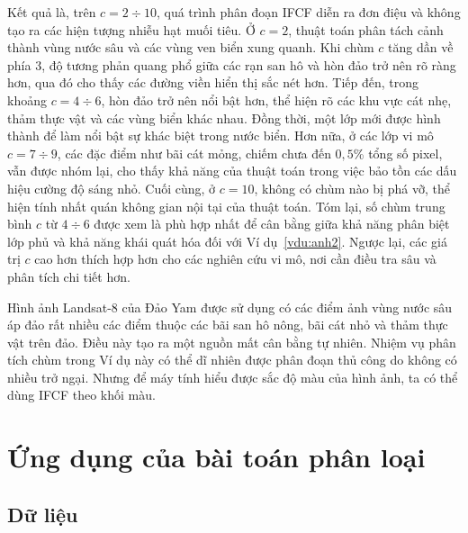 \documentclass[a4paper,oneside]{book} %
\theoremstyle{plain}
\theoremstyle{plain}
\theoremstyle{nonumberplain}
\begin{document}
Kết quả là, trên $c = 2\div10$, quá trình phân đoạn IFCF diễn ra đơn điệu và không tạo ra các hiện tượng nhiễu hạt muối tiêu. Ở $c = 2$, thuật toán phân tách cảnh thành vùng nước sâu và các vùng ven biển xung quanh. Khi chùm $c$ tăng dần về phía $3$, độ tương phản quang phổ giữa các rạn san hô và hòn đảo trở nên rõ ràng hơn, qua đó cho thấy các đường viền hiển thị sắc nét hơn.
Tiếp đến, trong khoảng $c = 4\div6$, hòn đảo trở nên nổi bật hơn, thể hiện rõ các khu vực cát nhẹ, thảm thực vật và các vùng biển khác nhau. Đồng thời, một lớp mới được hình thành để làm nổi bật sự khác biệt trong nước biển. Hơn nữa, ở các lớp vi mô $c = 7\div9$, các đặc điểm như bãi cát mỏng, chiếm chưa đến $0{,}5$\% tổng số pixel, vẫn được nhóm lại, cho thấy khả năng của thuật toán trong việc bảo tồn các dấu hiệu cường độ sáng nhỏ. Cuối cùng, ở $c = 10$, không có chùm nào bị phá vỡ, thể hiện tính nhất quán không gian nội tại của thuật toán.
Tóm lại, số chùm trung bình $c$ từ $4\div6$ được xem là phù hợp nhất để cân bằng giữa khả năng phân biệt lớp phủ và khả năng khái quát hóa đối với Ví dụ~\ref{vdu:anh2}. Ngược lại, các giá trị $c$ cao hơn thích hợp hơn cho các nghiên cứu vi mô, nơi cần điều tra sâu và phân tích chi tiết hơn.

Hình ảnh Landsat-8 của Đảo Yam được sử dụng có các điểm ảnh vùng nước sâu áp đảo rất nhiều các điểm thuộc các bãi san hô nông, bãi cát nhỏ và thảm thực vật trên đảo. Điều này tạo ra một nguồn mất cân bằng tự nhiên. Nhiệm vụ phân tích chùm trong Ví dụ này có thể dĩ nhiên được phân đoạn thủ công do không có nhiều trở ngại. Nhưng để máy tính hiểu được sắc độ màu của hình ảnh, ta có thể dùng IFCF theo khối màu. 



\section{Ứng dụng của bài toán phân loại}




\subsection{Dữ liệu}
\end{document}
